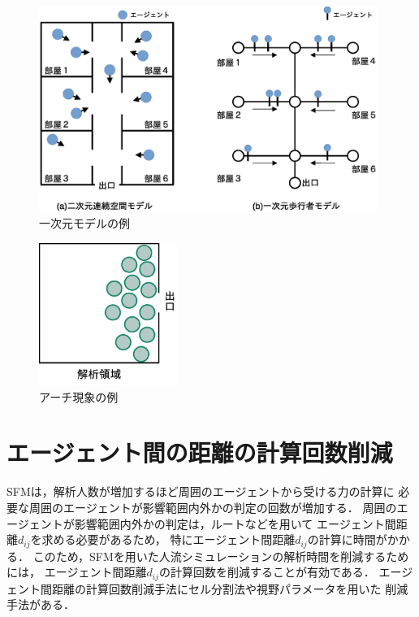 \begin{figure}[hbtp]
 \begin{center}
  \includegraphics[width=11cm,clip]{figure/ichijigen_ex.eps}
  \caption{一次元モデルの例}
  \label{fig:ichijigen_ex}
 \end{center}
\end{figure}

\begin{figure}[hbtp]
 \begin{center}
  \includegraphics[width=4.5cm,clip]{figure/atigenshou.eps}
  \caption{アーチ現象の例}
  \label{fig:atigenshou}
 \end{center}
\end{figure}

\section{エージェント間の距離の計算回数削減}
SFMは，解析人数が増加するほど周囲のエージェントから受ける力の計算に
必要な周囲のエージェントが影響範囲内外かの判定の回数が増加する．
周囲のエージェントが影響範囲内外かの判定は，ルートなどを用いて
エージェント間距離$d_{ij}$を求める必要があるため，
特にエージェント間距離$d_{ij}$の計算に時間がかかる．
このため，SFMを用いた人流シミュレーションの解析時間を削減するためには，
エージェント間距離$d_{ij}$の計算回数を削減することが有効である．
エージェント間距離の計算回数削減手法にセル分割法や視野パラメータを用いた
削減手法がある．

